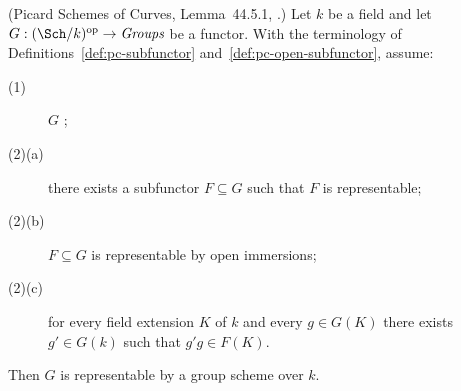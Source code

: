 \begin{theorem}\label{thm:pc-criterion}
(Picard Schemes of Curves, Lemma~44.5.1,
.)
Let $k$ be a field and let
$G:(\Sch/k)^{\mathrm{op}}\to\textit{Groups}$ be a functor.  With the
terminology of
Definitions~\ref{def:pc-subfunctor} and~\ref{def:pc-open-subfunctor}, assume:
\begin{description}
\item[(1)] $G$ ;
\item[(2)(a)] there exists a subfunctor $F\subseteq G$ such that $F$ is
representable;
\item[(2)(b)] $F\subseteq G$ is representable by open immersions;
\item[(2)(c)] for every field extension $K$ of $k$ and every
$g\in G(K)$ there exists $g'\in G(k)$ such that $g'g\in F(K)$.
\end{description}
Then $G$ is representable by a group scheme over $k$.
\end{theorem}
